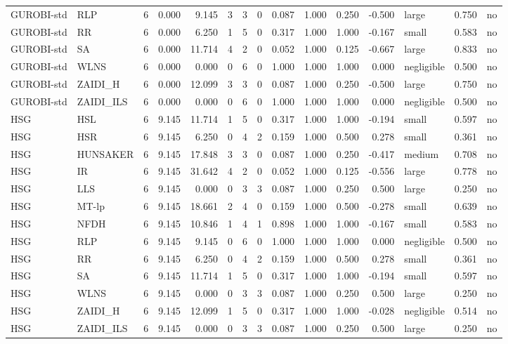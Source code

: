 \begin{table}[htbp]
\begin{tabular}{llrrrrrrrrrrlrr}
GUROBI-std & RLP & 6 & 0.000 & 9.145 & 3 & 3 & 0 & 0.087 & 1.000 & 0.250 & -0.500 & large & 0.750 & no \\
GUROBI-std & RR & 6 & 0.000 & 6.250 & 1 & 5 & 0 & 0.317 & 1.000 & 1.000 & -0.167 & small & 0.583 & no \\
GUROBI-std & SA & 6 & 0.000 & 11.714 & 4 & 2 & 0 & 0.052 & 1.000 & 0.125 & -0.667 & large & 0.833 & no \\
GUROBI-std & WLNS & 6 & 0.000 & 0.000 & 0 & 6 & 0 & 1.000 & 1.000 & 1.000 & 0.000 & negligible & 0.500 & no \\
GUROBI-std & ZAIDI\_H & 6 & 0.000 & 12.099 & 3 & 3 & 0 & 0.087 & 1.000 & 0.250 & -0.500 & large & 0.750 & no \\
GUROBI-std & ZAIDI\_ILS & 6 & 0.000 & 0.000 & 0 & 6 & 0 & 1.000 & 1.000 & 1.000 & 0.000 & negligible & 0.500 & no \\
HSG & HSL & 6 & 9.145 & 11.714 & 1 & 5 & 0 & 0.317 & 1.000 & 1.000 & -0.194 & small & 0.597 & no \\
HSG & HSR & 6 & 9.145 & 6.250 & 0 & 4 & 2 & 0.159 & 1.000 & 0.500 & 0.278 & small & 0.361 & no \\
HSG & HUNSAKER & 6 & 9.145 & 17.848 & 3 & 3 & 0 & 0.087 & 1.000 & 0.250 & -0.417 & medium & 0.708 & no \\
HSG & IR & 6 & 9.145 & 31.642 & 4 & 2 & 0 & 0.052 & 1.000 & 0.125 & -0.556 & large & 0.778 & no \\
HSG & LLS & 6 & 9.145 & 0.000 & 0 & 3 & 3 & 0.087 & 1.000 & 0.250 & 0.500 & large & 0.250 & no \\
HSG & MT-lp & 6 & 9.145 & 18.661 & 2 & 4 & 0 & 0.159 & 1.000 & 0.500 & -0.278 & small & 0.639 & no \\
HSG & NFDH & 6 & 9.145 & 10.846 & 1 & 4 & 1 & 0.898 & 1.000 & 1.000 & -0.167 & small & 0.583 & no \\
HSG & RLP & 6 & 9.145 & 9.145 & 0 & 6 & 0 & 1.000 & 1.000 & 1.000 & 0.000 & negligible & 0.500 & no \\
HSG & RR & 6 & 9.145 & 6.250 & 0 & 4 & 2 & 0.159 & 1.000 & 0.500 & 0.278 & small & 0.361 & no \\
HSG & SA & 6 & 9.145 & 11.714 & 1 & 5 & 0 & 0.317 & 1.000 & 1.000 & -0.194 & small & 0.597 & no \\
HSG & WLNS & 6 & 9.145 & 0.000 & 0 & 3 & 3 & 0.087 & 1.000 & 0.250 & 0.500 & large & 0.250 & no \\
HSG & ZAIDI\_H & 6 & 9.145 & 12.099 & 1 & 5 & 0 & 0.317 & 1.000 & 1.000 & -0.028 & negligible & 0.514 & no \\
HSG & ZAIDI\_ILS & 6 & 9.145 & 0.000 & 0 & 3 & 3 & 0.087 & 1.000 & 0.250 & 0.500 & large & 0.250 & no \\

\end{tabular}
\end{table}
